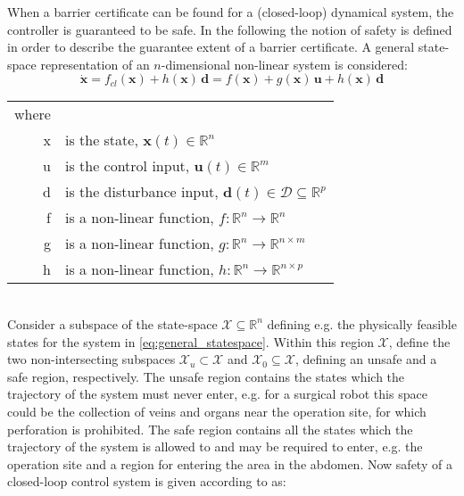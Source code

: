 When a barrier certificate can be found for a (closed-loop) dynamical system, the controller is guaranteed to be safe. In the following the notion of safety is defined in order to describe the guarantee extent of a barrier certificate. A general state-space representation of an $n$-dimensional non-linear system is considered:
\begin{equation}
\dot{\mathbf{x}} = f_{cl}(\mathbf{x}) + h(\mathbf{x})\,\mathbf{d} = f(\mathbf{x}) + g(\mathbf{x})\,\mathbf{u} + h(\mathbf{x})\,\mathbf{d}
\label{eq:general_statespace}
\end{equation}
\begin{tabular}{rl} 
where &  \\
\gls{x} &  is the state, $\mathbf{x}(t) \in \mathbb{R}^n$\\
\gls{u} & is the control input, $\mathbf{u}(t) \in \mathbb{R}^m$\\
\gls{d} & is the disturbance input, $\mathbf{d}(t) \in \mathcal{D} \subseteq \mathbb{R}^p$ \\
\gls{f} & is a non-linear function, $f:\mathbb{R}^n \rightarrow \mathbb{R}^n$\\
\gls{g} & is a non-linear function, $g:\mathbb{R}^n \rightarrow \mathbb{R}^{n \times m}$\\
\gls{h} & is a non-linear function, $h:\mathbb{R}^n \rightarrow \mathbb{R}^{n \times p}$
\end{tabular}\\

Consider a subspace of the state-space $\mathcal{X}\subseteq\mathbb{R}^n$ defining e.g. the physically feasible states for the system in \autoref{eq:general_statespace}. Within this region $\mathcal{X}$, define the two non-intersecting subspaces $\mathcal{X}_u\subset\mathcal{X}$ and $\mathcal{X}_0\subseteq\mathcal{X}$, defining an unsafe  and a safe region, respectively. The unsafe region contains the states which the trajectory of the system must never enter, e.g. for a surgical robot this space could be the collection of veins and organs near the operation site, for which perforation is prohibited. The safe region contains all the states which the trajectory of the system is allowed to and may be required to enter, e.g. the operation site and a region for entering the area in the abdomen.
Now safety of a closed-loop control system is given according to \citep{bib:safety,bib:prajna_framework} as:

